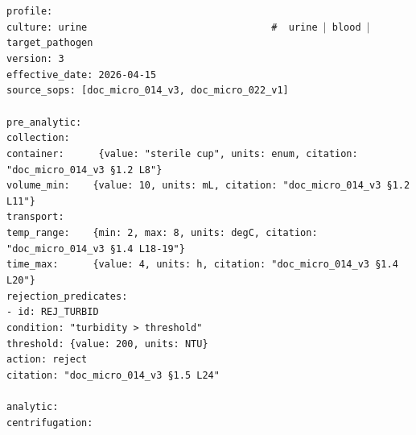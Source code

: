 \documentclass[10pt,letterpaper]{article}
\begin{document}
\noindent\texttt{\scriptsize profile:\\
\hspace*{1em}culture: urine\,\,\,\,\,\,\,\,\,\,\,\,\,\,\,\,\,\,\,\,\,\,\,\,\,\,\,\,\,\,\,\,\#\, urine $|$ blood $|$ target\_pathogen\\
\hspace*{1em}version: 3\\
\hspace*{1em}effective\_date: 2026-04-15\\
\hspace*{1em}source\_sops: [doc\_micro\_014\_v3, doc\_micro\_022\_v1]\\
\\
pre\_analytic:\\
\hspace*{1em}collection:\\
\hspace*{2em}container:\,\,\,\,\,\,\{value: "sterile cup", units: enum, citation: "doc\_micro\_014\_v3 \S 1.2 L8"\}\\
\hspace*{2em}volume\_min:\,\,\,\,\{value: 10, units: mL, citation: "doc\_micro\_014\_v3 \S 1.2 L11"\}\\
\hspace*{1em}transport:\\
\hspace*{2em}temp\_range:\,\,\,\,\{min: 2, max: 8, units: degC, citation: "doc\_micro\_014\_v3 \S 1.4 L18-19"\}\\
\hspace*{2em}time\_max:\,\,\,\,\,\,\{value: 4, units: h, citation: "doc\_micro\_014\_v3 \S 1.4 L20"\}\\
\hspace*{1em}rejection\_predicates:\\
\hspace*{2em}- id: REJ\_TURBID\\
\hspace*{3em}condition: "turbidity > threshold"\\
\hspace*{3em}threshold: \{value: 200, units: NTU\}\\
\hspace*{3em}action: reject\\
\hspace*{3em}citation: "doc\_micro\_014\_v3 \S 1.5 L24"\\
\\
analytic:\\
\hspace*{1em}centrifugation:\\
}
\end{document}

